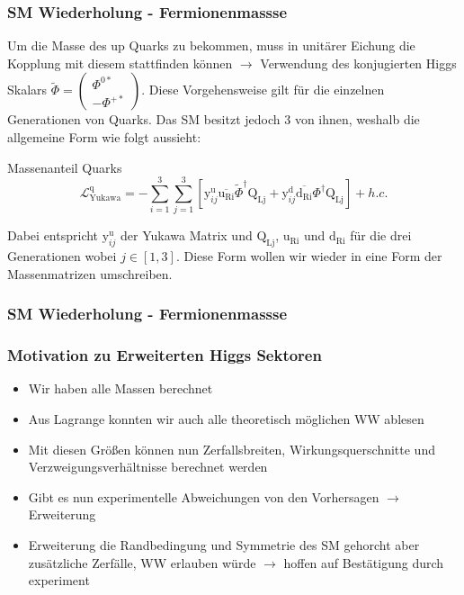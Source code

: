 \documentclass{beamer}
\begin{document}
\begin{frame}
\frametitle{SM Wiederholung - Fermionenmassse}
Um die Masse des up Quarks zu bekommen, muss in unitärer Eichung die Kopplung mit diesem stattfinden können $\rightarrow$ Verwendung des konjugierten Higgs Skalars  $\tilde{\Phi}=\left( \begin{array}{c} \Phi^{0*}\\ -\Phi^{+*} \end{array}\right)$. Diese Vorgehensweise gilt für die einzelnen Generationen von Quarks. Das SM besitzt jedoch 3 von ihnen, weshalb die allgemeine Form wie folgt aussieht:
\begin{block}{Massenanteil Quarks}
\begin{equation}
\mathscr{L}_{\text{Yukawa}}^{\text{q}}=- \sum_{i=1}^{3} \sum_{j=1}^{3} [\text{y}^{\text{u}}_{ij}\overline{\text{u}_{\text{Ri}}} \tilde{\Phi}^{\dagger}\text{Q}_{\text{Lj}}+\text{y}^{\text{d}}_{ij} \overline{\text{d}_{\text{Ri}}}\Phi^{\dagger} \text{Q}_{\text{Lj}}]+h.c.
\end{equation}
\end{block}
Dabei entspricht $\text{y}^{\text{u}}_{ij}$ der Yukawa Matrix und $\text{Q}_{\text{Lj}}$, $\text{u}_{\text{Ri}}$ und $\text{d}_{\text{Ri}}$ für die drei Generationen wobei $j \in [1,3]$.
Diese Form wollen wir wieder in eine Form der Massenmatrizen umschreiben.


\end{frame}

\begin{frame}
\frametitle{SM Wiederholung - Fermionenmassse}
\end{frame}
\begin{frame}
\frametitle{Motivation zu Erweiterten Higgs Sektoren}
\begin{itemize}
\item Wir haben alle Massen berechnet 
\item Aus Lagrange konnten wir auch alle theoretisch möglichen WW ablesen 
\item Mit diesen Größen können nun Zerfallsbreiten, Wirkungsquerschnitte und Verzweigungsverhältnisse berechnet werden
\item Gibt es nun experimentelle Abweichungen von den Vorhersagen $\rightarrow$ Erweiterung
\item Erweiterung die Randbedingung und Symmetrie des SM gehorcht aber zusätzliche Zerfälle, WW erlauben würde $\rightarrow$ hoffen auf Bestätigung durch experiment
\end{itemize}
\end{frame}
\end{document}
